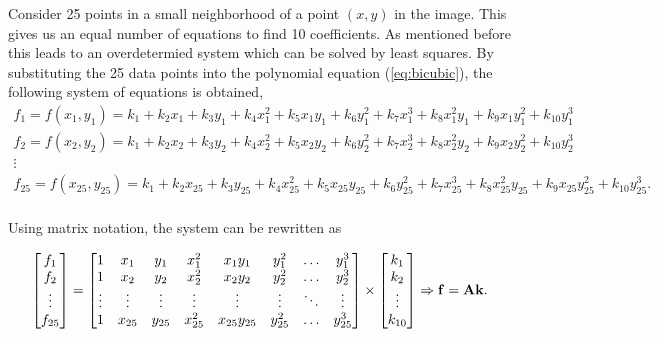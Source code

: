\documentclass{ipol}
\numberwithin{equation}{section}
\numberwithin{table}{section}
\begin{document}
Consider 25 points in a small neighborhood of a point $(x,y)$ in the image. This gives us an equal number of equations 
to find 10 coefficients. As mentioned before this leads to an overdetermied system which can be solved by least squares. 
By substituting the 25 data points into the polynomial equation (\ref{eq:bicubic}), the following system of 
equations is obtained,
\begin{equation*}
	\begin{array}{l}
		f_1 = f(x_1,y_1) = k_1 + k_2x_1 + k_3y_1 + k_4x_1^2 + k_5x_1y_1 + k_6y_1^2 + k_7x_1^3 + k_8x_1^2y_1 + k_9x_1y_1^2 + k_{10}y_1^3 \\
		f_2 = f(x_2,y_2) = k_1 + k_2x_2 + k_3y_2 + k_4x_2^2 + k_5x_2y_2 + k_6y_2^2 + k_7x_2^3 + k_8x_2^2y_2 + k_9x_2y_2^2 + k_{10}y_2^3 \\
		\vdots \\
		f_{25} = f(x_{25},y_{25}) = k_1 + k_2x_{25} + k_3y_{25} + k_4x_{25}^2 + k_5x_{25}y_{25} + k_6y_{25}^2 + k_7x_{25}^3 + k_8x_{25}^2y_{25} + k_9x_{25}y_{25}^2 + k_{10}y_{25}^3 . \\
	\end{array}
\end{equation*}

Using matrix notation, the system can be rewritten as

\begin{equation*}
	\begin{bmatrix} 
		f_1		\\ 
		f_2		\\ 
		\vdots	\\
		f_{25}
	\end{bmatrix} 
	= 
	\begin{bmatrix} 
		1 		& x_1 		& y_1 		& x_1^2 	& x_1y_1 		& y_1^2 	& \hdots 	& y_1^3 	\\
		1 		& x_2 		& y_2 		& x_2^2 	& x_2y_2 		& y_2^2 	& \hdots 	& y_2^3 	\\
		\vdots	& \vdots	& \vdots	& \vdots	& \vdots		& \vdots	& \ddots	& \vdots	\\
		1 		& x_{25}	& y_{25}	& x_{25}^2 	& x_{25}y_{25} 	& y_{25}^2 	& \hdots 	& y_{25}^3
	\end{bmatrix}
	\times
	\begin{bmatrix}
		k_1		\\
		k_2		\\
		\vdots	\\
		k_{10}
	\end{bmatrix}
	\Rightarrow \mathbf{f} = \mathbf{A}\mathbf{k} .\\
\end{equation*}
\end{document}
